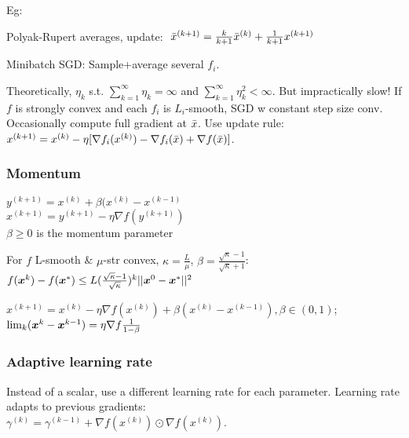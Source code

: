  Eg:
\begin{inparaitem}[$\color{mygreen} \triangleright$]
    \item Polyak-Rupert averages, update: $\ \Bar{x}^{(k+1)} = \frac{k}{k+1}\Bar{x}^{(k)} + \frac{1}{k+1}x^{(k+1)}$\\
    \item Minibatch SGD: Sample+average several $f_i$.
\end{inparaitem}

 Theoretically, $\eta_k$ s.t. $\sum_{k=1}^{\infty}\eta_k = \infty$ and $\sum_{k=1}^{\infty}\eta_k^2 < \infty$. But impractically slow! If $f$ is strongly convex and each $f_i$ is $L_i$-smooth, SGD w constant step size conv.
 Occasionally compute full gradient at $\Bar{x}$. Use update rule:\\ $x^{(k+1)} = x^{(k)} - \eta[\nabla f_i(x^{(k)}) - \nabla f_i(\Bar{x}) + \nabla f(\Bar{x})]$.

\subsubsection*{Momentum}

 $y^{(k+1)} = x^{(k)} + \beta (x^{(k)} - x^{(k-1)}$\\
 $x^{(k+1)} = y^{(k+1)} - \eta \nabla f(y^{(k+1)})$\\
 $\beta \ge 0$ is the momentum parameter
 
  For $f$ L-smooth \& $\mu$-str convex, $\kappa=\frac{L}{\mu}$, $\beta=\frac{\sqrt{\kappa}-1}{\sqrt{\kappa}+1}$:
$f(\boldsymbol{x}^k)-f(\boldsymbol{x}^*)\le L(\frac{\sqrt{\kappa}-1}{\sqrt{\kappa}})^k ||\boldsymbol{x}^0-\boldsymbol{x}^*||^2$

 
 $x^{(k+1)} = x^{(k)} - \eta \nabla f(x^{(k)}) + \beta (x^{(k)} - x^{(k-1)}), \beta \in (0,1)$; $\lim_k(\boldsymbol{x}^k-\boldsymbol{x}^{k-1})=\eta\nabla f\frac{1}{1-\beta}$
 \subsubsection*{Adaptive learning rate}
 Instead of a scalar, use a different learning rate for each parameter. Learning rate adapts to previous gradients:\\
 $\gamma^{(k)} = \gamma^{(k-1)} + \nabla f(x^{(k)}) \odot \nabla f(x^{(k)})$.
 
